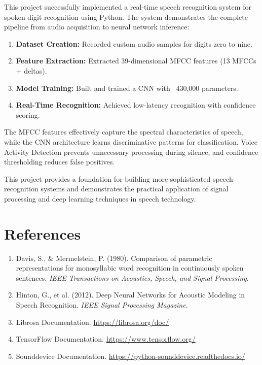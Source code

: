 \documentclass[a4paper,12pt]{article}
\begin{document}
This project successfully implemented a real-time speech recognition system for spoken digit recognition using Python. The system demonstrates the complete pipeline from audio acquisition to neural network inference:

\begin{enumerate}
    \item \textbf{Dataset Creation:} Recorded custom audio samples for digits zero to nine.
    \item \textbf{Feature Extraction:} Extracted 39-dimensional MFCC features (13 MFCCs + deltas).
    \item \textbf{Model Training:} Built and trained a CNN with ~430,000 parameters.
    \item \textbf{Real-Time Recognition:} Achieved low-latency recognition with confidence scoring.
\end{enumerate}

The MFCC features effectively capture the spectral characteristics of speech, while the CNN architecture learns discriminative patterns for classification. Voice Activity Detection prevents unnecessary processing during silence, and confidence thresholding reduces false positives.

This project provides a foundation for building more sophisticated speech recognition systems and demonstrates the practical application of signal processing and deep learning techniques in speech technology.

\section{References}

\begin{enumerate}
    \item Davis, S., \& Mermelstein, P. (1980). Comparison of parametric representations for monosyllabic word recognition in continuously spoken sentences. \textit{IEEE Transactions on Acoustics, Speech, and Signal Processing}.
    
    \item Hinton, G., et al. (2012). Deep Neural Networks for Acoustic Modeling in Speech Recognition. \textit{IEEE Signal Processing Magazine}.
    
    \item Librosa Documentation. \url{https://librosa.org/doc/}
    
    \item TensorFlow Documentation. \url{https://www.tensorflow.org/}
    
    \item Sounddevice Documentation. \url{https://python-sounddevice.readthedocs.io/}
\end{enumerate}
\end{document}
